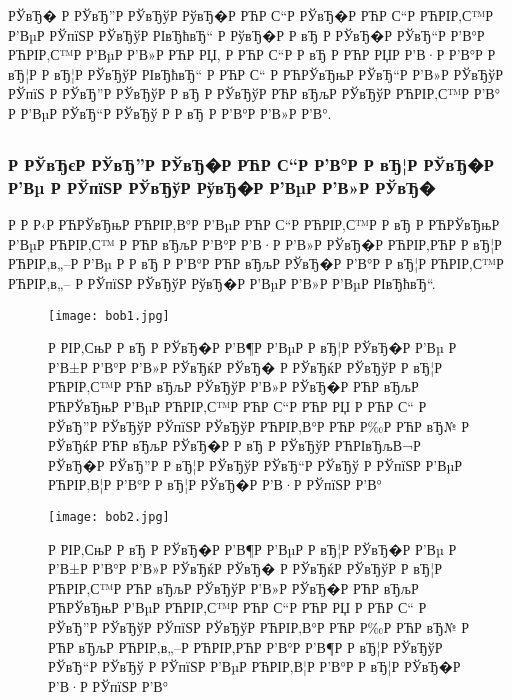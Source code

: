 \documentclass[a4paper,14pt]{extarticle}
\begin{document}
РЎвЂ� Р  РЎвЂ”Р  РЎвЂўР  РўвЂ�Р РЋР С“Р  РЎвЂ�Р РЋР С“Р РЋРІР‚С™Р  Р’ВµР  РЎпїЅР  РЎвЂўР  РІвЂћвЂ“ Р  РўвЂ�Р  Р вЂ Р  РЎвЂ�Р  РЎвЂ“Р  Р’В°Р РЋРІР‚С™Р  Р’ВµР  Р’В»Р РЋР РЏ, Р РЋР С“Р  Р вЂ Р РЋР РЏР  Р’В·Р  Р’В°Р  Р вЂ¦Р  Р вЂ¦Р  РЎвЂўР  РІвЂћвЂ“ Р РЋР С“ Р РЋРЎвЂњР  РЎвЂ“Р  Р’В»Р  РЎвЂўР  РЎпїЅ Р  РЎвЂ”Р  РЎвЂўР  Р вЂ Р  РЎвЂўР РЋР вЂљР  РЎвЂўР РЋРІР‚С™Р  Р’В° Р  Р’ВµР  РЎвЂ“Р  РЎвЂў Р  Р вЂ Р  Р’В°Р  Р’В»Р  Р’В°.
\clearpage
\subsection{}
\subsubsection{Р  РЎвЂєР  РЎвЂ”Р  РЎвЂ�Р РЋР С“Р  Р’В°Р  Р вЂ¦Р  РЎвЂ�Р  Р’Вµ Р  РЎпїЅР  РЎвЂўР  РўвЂ�Р  Р’ВµР  Р’В»Р  РЎвЂ�}
 
Р  Р Р‹Р РЋРЎвЂњР РЋРІР‚В°Р  Р’ВµР РЋР С“Р РЋРІР‚С™Р  Р вЂ Р РЋРЎвЂњР  Р’ВµР РЋРІР‚С™ Р РЋР вЂљР  Р’В°Р  Р’В·Р  Р’В»Р  РЎвЂ�Р РЋРІР‚РЋР  Р вЂ¦Р РЋРІР‚в„–Р  Р’Вµ Р  Р вЂ Р  Р’В°Р РЋР вЂљР  РЎвЂ�Р  Р’В°Р  Р вЂ¦Р РЋРІР‚С™Р РЋРІР‚в„– Р  РЎпїЅР  РЎвЂўР  РўвЂ�Р  Р’ВµР  Р’В»Р  Р’ВµР  РІвЂћвЂ“.
 
\begin{figure}[h!]
\centering
\texttt{[image: bob1.jpg]}
\caption{Р  РІР‚СњР  Р вЂ Р  РЎвЂ�Р  Р’В¶Р  Р’ВµР  Р вЂ¦Р  РЎвЂ�Р  Р’Вµ Р  Р’В±Р  Р’В°Р  Р’В»Р  РЎвЂќР  РЎвЂ� Р  РЎвЂќР  РЎвЂўР  Р вЂ¦Р РЋРІР‚С™Р РЋР вЂљР  РЎвЂўР  Р’В»Р  РЎвЂ�Р РЋР вЂљР РЋРЎвЂњР  Р’ВµР РЋРІР‚С™Р РЋР С“Р РЋР РЏ Р РЋР С“ Р  РЎвЂ”Р  РЎвЂўР  РЎпїЅР  РЎвЂўР РЋРІР‚В°Р РЋР Р‰Р РЋР вЂ№ Р  РЎвЂќР РЋР вЂљР  РЎвЂ�Р  Р вЂ Р  РЎвЂўР РЋРІвЂљВ¬Р  РЎвЂ�Р  РЎвЂ”Р  Р вЂ¦Р  РЎвЂўР  РЎвЂ“Р  РЎвЂў Р  РЎпїЅР  Р’ВµР РЋРІР‚В¦Р  Р’В°Р  Р вЂ¦Р  РЎвЂ�Р  Р’В·Р  РЎпїЅР  Р’В°}
\label{graph_fragment1}
\end{figure}
 
\begin{figure}[h!]
\centering
\texttt{[image: bob2.jpg]}
\caption{Р  РІР‚СњР  Р вЂ Р  РЎвЂ�Р  Р’В¶Р  Р’ВµР  Р вЂ¦Р  РЎвЂ�Р  Р’Вµ Р  Р’В±Р  Р’В°Р  Р’В»Р  РЎвЂќР  РЎвЂ� Р  РЎвЂќР  РЎвЂўР  Р вЂ¦Р РЋРІР‚С™Р РЋР вЂљР  РЎвЂўР  Р’В»Р  РЎвЂ�Р РЋР вЂљР РЋРЎвЂњР  Р’ВµР РЋРІР‚С™Р РЋР С“Р РЋР РЏ Р РЋР С“ Р  РЎвЂ”Р  РЎвЂўР  РЎпїЅР  РЎвЂўР РЋРІР‚В°Р РЋР Р‰Р РЋР вЂ№ Р РЋР вЂљР РЋРІР‚в„–Р РЋРІР‚РЋР  Р’В°Р  Р’В¶Р  Р вЂ¦Р  РЎвЂўР  РЎвЂ“Р  РЎвЂў Р  РЎпїЅР  Р’ВµР РЋРІР‚В¦Р  Р’В°Р  Р вЂ¦Р  РЎвЂ�Р  Р’В·Р  РЎпїЅР  Р’В°}
\label{graph_fragment2}
\end{figure}
 
\end{document}
